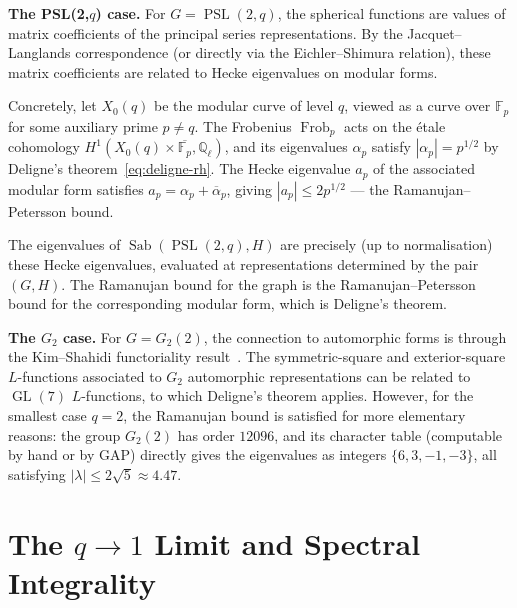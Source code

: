 \documentclass[11pt,a4paper]{article}
\theoremstyle{plain}
\theoremstyle{definition}
\newcommand{\Q}{\mathbb{Q}}
\newcommand{\F}{\mathbb{F}}
\newcommand{\Sab}{\operatorname{Sab}}
\newcommand{\PSL}{\operatorname{PSL}}
\newcommand{\GL}{\operatorname{GL}}
\newcommand{\Frob}{\operatorname{Frob}}
\begin{document}
\begin{tcolorbox}[breakable, colback=yellow!12, colframe=yellow!12,
  boxrule=0pt, sharp corners]
\textbf{The PSL(2,$q$) case.}
For $G = \PSL(2, q)$, the spherical functions are values of matrix
coefficients of the principal series representations. By the
Jacquet--Langlands correspondence (or directly via the Eichler--Shimura
relation), these matrix coefficients are related to Hecke eigenvalues
on modular forms.

Concretely, let $X_0(q)$ be the modular curve of level $q$, viewed as
a curve over $\F_p$ for some auxiliary prime $p \neq q$. The Frobenius
$\Frob_p$ acts on the \'etale cohomology $H^1(X_0(q) \times
\overline{\F_p}, \Q_\ell)$, and its eigenvalues $\alpha_p$ satisfy
$|\alpha_p| = p^{1/2}$ by Deligne's theorem~\eqref{eq:deligne-rh}.
The Hecke eigenvalue $a_p$ of the associated modular form satisfies
$a_p = \alpha_p + \overline{\alpha}_p$, giving
$|a_p| \leq 2p^{1/2}$ --- the Ramanujan--Petersson bound.

The eigenvalues of $\Sab(\PSL(2,q), H)$ are precisely (up to
normalisation) these Hecke eigenvalues, evaluated at representations
determined by the pair $(G, H)$. The Ramanujan bound for the graph
is the Ramanujan--Petersson bound for the corresponding modular form,
which is Deligne's theorem.
\end{tcolorbox}

\begin{tcolorbox}[breakable, colback=black!5, colframe=black!5,
  boxrule=0pt, sharp corners]
\textbf{The $G_2$ case.}
For $G = G_2(2)$, the connection to automorphic forms is through the
Kim--Shahidi functoriality result~\cite{KimShahidi2002}. The
symmetric-square and exterior-square $L$-functions associated to
$G_2$ automorphic representations can be related to $\GL(7)$
$L$-functions, to which Deligne's theorem applies. However, for the
smallest case $q = 2$, the Ramanujan bound is satisfied for more
elementary reasons: the group $G_2(2)$ has order $12096$, and its
character table (computable by hand or by GAP) directly gives the
eigenvalues as integers $\{6, 3, -1, -3\}$, all satisfying
$|\lambda| \leq 2\sqrt{5} \approx 4.47$.
\end{tcolorbox}


\section{The $q \to 1$ Limit and Spectral Integrality}
\label{sec:q-to-1}
\end{document}
